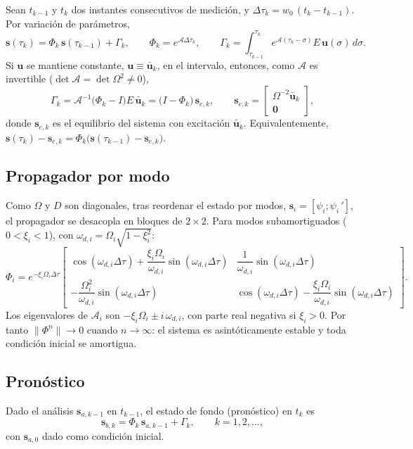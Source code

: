 Sean $t_{k-1}$ y $t_k$ dos instantes consecutivos de medición, y $\Delta\tau_k=w_0\,(t_k-t_{k-1})$. Por variación de parámetros,
\[
\mathbf s(\tau_k)=\Phi_k\,\mathbf s(\tau_{k-1})+\Gamma_k,\qquad
\Phi_k=e^{\mathcal A\Delta\tau_k},\qquad
\Gamma_k=\int_{\tau_{k-1}}^{\tau_k}e^{\mathcal A(\tau_k-\sigma)}E\,\mathbf u(\sigma)\,d\sigma .
\]
Si $\mathbf u$ se mantiene constante, $\mathbf u\equiv\bar{\mathbf u}_k$, en el intervalo, entonces, como $\mathcal A$ es invertible ($\det\mathcal A=\det\Omega^2\neq0$),
\[
\Gamma_k=\mathcal A^{-1}\big(\Phi_k-I\big)E\,\bar{\mathbf u}_k=\big(I-\Phi_k\big)\,\mathbf s_{e,k},\qquad
\mathbf s_{e,k}=\begin{bmatrix}\Omega^{-2}\bar{\mathbf u}_k\\ \mathbf 0\end{bmatrix},
\]
donde $\mathbf s_{e,k}$ es el equilibrio del sistema con excitación $\bar{\mathbf u}_k$. Equivalentemente, $\mathbf s(\tau_k)-\mathbf s_{e,k}=\Phi_k\big(\mathbf s(\tau_{k-1})-\mathbf s_{e,k}\big)$.

\subsection{Propagador por modo}

Como $\Omega$ y $D$ son diagonales, tras reordenar el estado por modos, $\mathbf s_i=[\psi_i;\psi_i\,']$, el propagador se desacopla en bloques de $2\times2$. Para modos subamortiguados ($0<\xi_i<1$), con $\omega_{d,i}=\Omega_i\sqrt{1-\xi_i^2}$:
\[
\Phi_i=e^{-\xi_i\Omega_i\Delta\tau}
\begin{bmatrix}
\cos(\omega_{d,i}\Delta\tau)+\dfrac{\xi_i\Omega_i}{\omega_{d,i}}\sin(\omega_{d,i}\Delta\tau)
&\dfrac{1}{\omega_{d,i}}\sin(\omega_{d,i}\Delta\tau)\\[10pt]
-\dfrac{\Omega_i^2}{\omega_{d,i}}\sin(\omega_{d,i}\Delta\tau)
&\cos(\omega_{d,i}\Delta\tau)-\dfrac{\xi_i\Omega_i}{\omega_{d,i}}\sin(\omega_{d,i}\Delta\tau)
\end{bmatrix}.
\]
Los eigenvalores de $\mathcal A_i$ son $-\xi_i\Omega_i\pm i\,\omega_{d,i}$, con parte real negativa si $\xi_i>0$. Por tanto $\|\Phi^n\|\to0$ cuando $n\to\infty$: el sistema es asintóticamente estable y toda condición inicial se amortigua.

\subsection{Pronóstico}

Dado el análisis $\mathbf s_{a,k-1}$ en $t_{k-1}$, el estado de fondo (pronóstico) en $t_k$ es
\[
\mathbf s_{b,k}=\Phi_k\,\mathbf s_{a,k-1}+\Gamma_k,\qquad k=1,2,\ldots,
\]
con $\mathbf s_{a,0}$ dado como condición inicial.


